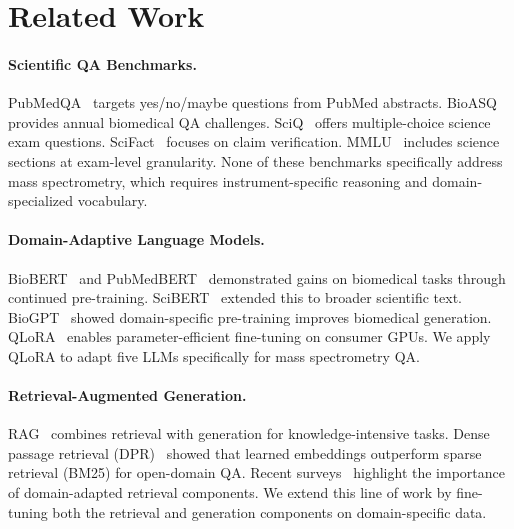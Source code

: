 \documentclass[11pt]{article}
\begin{document}
\section{Related Work}
\label{sec:related}

\paragraph{Scientific QA Benchmarks.}
PubMedQA~\citep{jin2019pubmedqa} targets yes/no/maybe questions from PubMed
abstracts. BioASQ~\citep{tsatsaronis2015overview} provides annual biomedical
QA challenges. SciQ~\citep{welbl2017crowdsourcing} offers multiple-choice
science exam questions. SciFact~\citep{wadden2020fact} focuses on claim
verification. MMLU~\citep{hendrycks2021measuring} includes science sections
at exam-level granularity. None of these benchmarks specifically address
mass spectrometry, which requires instrument-specific reasoning and
domain-specialized vocabulary.

\paragraph{Domain-Adaptive Language Models.}
BioBERT~\citep{lee2020biobert} and PubMedBERT~\citep{gu2021domain}
demonstrated gains on biomedical tasks through continued pre-training.
SciBERT~\citep{beltagy2019scibert} extended this to broader scientific text.
BioGPT~\citep{luo2022biogpt} showed domain-specific pre-training improves
biomedical generation. QLoRA~\citep{dettmers2024qlora} enables parameter-efficient
fine-tuning on consumer GPUs. We apply QLoRA to adapt five LLMs specifically
for mass spectrometry QA.

\paragraph{Retrieval-Augmented Generation.}
RAG~\citep{lewis2020rag} combines retrieval with generation for
knowledge-intensive tasks. Dense passage retrieval
(DPR)~\citep{karpukhin2020dpr} showed that learned embeddings outperform
sparse retrieval (BM25) for open-domain QA. Recent
surveys~\citep{gao2024ragsurvey} highlight the importance of domain-adapted
retrieval components. We extend this line of work by fine-tuning both the
retrieval and generation components on domain-specific data.
\end{document}
